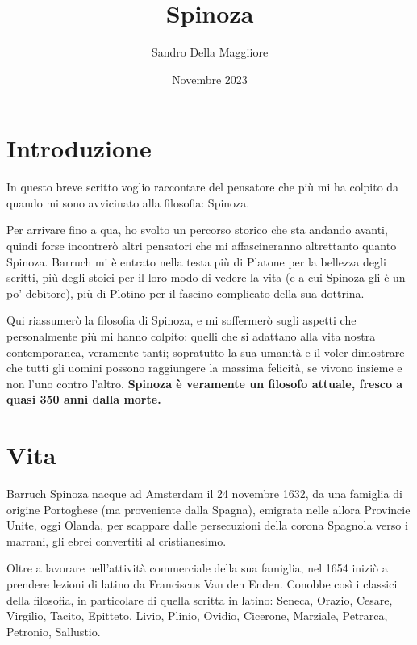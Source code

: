 \documentclass[a4paper,12pt,notitlepage]{report}
\begin{document}
	\author{Sandro Della Maggiiore}
	\title{Spinoza}
	\date{Novembre 2023}
	\maketitle
	\chapter*{Introduzione}
	
	In questo breve scritto voglio raccontare del pensatore che più mi ha colpito da quando mi sono avvicinato alla filosofia: Spinoza.
	
	Per arrivare fino a qua, ho svolto un percorso storico che sta andando avanti, quindi forse incontrerò  altri pensatori che mi affascineranno altrettanto quanto Spinoza. Barruch mi è entrato nella testa più di Platone per la bellezza degli scritti, più degli stoici per il loro modo di vedere la vita (e a cui Spinoza gli è un po' debitore), più di Plotino per il fascino complicato della sua dottrina.
	
	Qui riassumerò la filosofia di Spinoza, e mi soffermerò sugli aspetti che  personalmente più mi hanno colpito: quelli che si adattano alla vita nostra contemporanea, veramente tanti; sopratutto la sua umanità e il voler dimostrare che tutti gli uomini possono raggiungere la massima felicità, se vivono insieme e non l'uno contro l'altro. \textbf{Spinoza è veramente un filosofo attuale, fresco a quasi 350 anni dalla morte.}
	\chapter*{Vita}
	
	
	Barruch Spinoza nacque ad Amsterdam il 24 novembre 1632, da una famiglia di origine Portoghese (ma proveniente dalla Spagna), emigrata nelle allora Provincie Unite, oggi Olanda, per scappare dalle persecuzioni della corona Spagnola verso i marrani, gli ebrei convertiti al cristianesimo.
	
	Oltre a lavorare nell'attività commerciale della sua famiglia, nel 1654 iniziò a prendere lezioni di latino da Franciscus Van den Enden. Conobbe così i classici della filosofia, in particolare di quella scritta in latino: Seneca, Orazio, Cesare, Virgilio, Tacito, Epitteto, Livio, Plinio, Ovidio, Cicerone, Marziale, Petrarca, Petronio, Sallustio.
	
\end{document}
